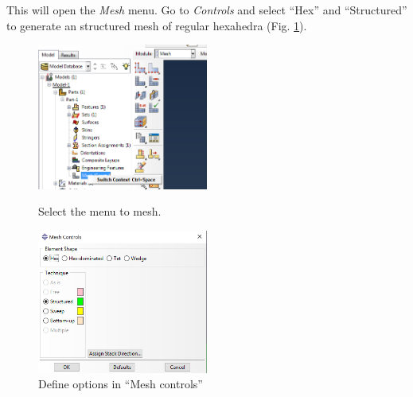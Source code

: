 \documentclass[spanish,a4paper,12pt]{article}
\begin{document}

This will open the \emph{Mesh} menu. Go to \emph{Controls} and select ``Hex'' and ``Structured'' to generate an structured mesh of regular hexahedra
(Fig. \ref{fig:mesh-controls}).
\begin{figure}[h!tp]
\parbox[t]{0.49\textwidth}{%
\includegraphics[width=0.5\textwidth]{capturas/29-mesh.png}
\caption{Select the menu to mesh.}
\label{fig:mesh-part}%
}\quad
\parbox[t]{0.49\textwidth}{%
\includegraphics[width=0.5\textwidth]{capturas/30-mesh-x.png}
\caption{Define options in ``Mesh controls''}
\label{fig:mesh-controls}%
}%
\end{figure}

\end{document}
